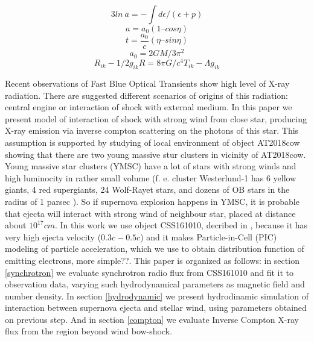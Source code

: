 \documentclass[a4paper,12pt]{extreport}
\begin{document}
\begin{equation}
3 ln~a = -\int d\epsilon/(\epsilon + p)
\end{equation}
\begin{equation}
a=a_0(1 – cos \eta)
\end{equation}
\begin{equation}
t=\frac{a_0}{c} (\eta – sin \eta)
\end{equation}
\begin{equation}
a_0 = 2GM/3\pi^2
\end{equation}
\begin{equation}
R_{ik}-1/2 g_{ik}R=8\pi G/c^4 T_{ik}-\Lambda g_{ik}
\end{equation}

Recent observations of Fast Blue Optical Transients \cite{Margutti2019, Ho2019cow,Ho2020koala,Coppejans2020, Ho2021at2020, YaoAt2020mrf} show high level of X-ray radiation. There are suggested different scenarios of  origins of this radiation: central engine or interaction of shock with external medium. In this paper we present model of interaction of shock with strong wind from close star, producing X-ray emission via inverse compton scattering on the photons of this star. This assumption is supported by studying of local environment of object AT2018cow \cite{SunAT2018environment} showing that there are two young massive stur clusters in vicinity of AT2018cow. Young massive star clusters (YMSC) have a lot of stars with strong winds and high luminocity in rather small volume (f. e. cluster Westerlund-1 has 6 yellow giants, 4 red supergiants, 24 Wolf-Rayet stars, and dozens of OB stars in the radius of 1 parsec \cite{Clark2005westerlund, Crowther2006westerlund, Negueruela2010westerlund}). So if supernova explosion happens in YMSC, it is probable that ejecta will interact with strong wind of neighbour star, placed at distance about $10^{17}  cm$.  In this work we use object CSS161010, decribed in \cite{Coppejans2020}, because it has very high ejecta velocity ($0.3 c - 0.5 c$) and it makes Particle-in-Cell (PIC) modeling of particle acceleration, which we use to obtain distribution function of emitting electrons, more simple??. This paper is organized as follows: in section \ref{synchrotron} we evaluate synchrotron radio flux from CSS161010 and fit it to observation data, varying such hydrodynamical parameters as magnetic field and number density. In section \ref{hydrodynamic} we present hydrodinamic simulation of interaction between supernova ejecta and stellar wind, using parameters obtained on previous step. And in section \ref{compton} we evaluate Inverse Compton X-ray flux from the region beyond wind bow-shock.
\end{document}
